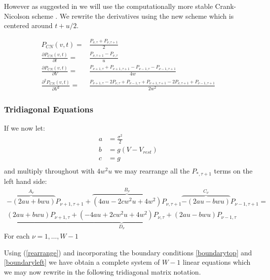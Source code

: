 \documentclass[10pt]{article}
\begin{document}
However as suggested in \cite{PaninskiHaithSzirtes} we will use the
computationally more stable Crank-Nicolson scheme \cite{press}.  
We rewrite the derivatives using the new scheme which is centered around $t +
u/2$.

\begin{eqnarray}
    P_{CN}(v,t) =& \frac{P_{\nu,\tau} + P_{\nu,\tau + 1}}{2} \\
    \frac{\partial P_{CN}(v,t)}{\partial t} =& \frac{P_{\nu,\tau +1 } -
    P_{\nu,\tau}}{u} \\
    \frac{\partial P_{CN}(v,t)}{\partial V} =&
    \frac{P_{\nu +1,\tau } + P_{\nu +1,\tau +1 } -
    P_{\nu - 1,\tau } - P_{\nu -1,\tau +1}} 
    {4w} \\
    \frac{\partial^2 P_{CN}(v,t)}{\partial V^2} =&
    \frac{P_{\nu+1,\tau} - 2 P_{\nu,\tau} + P_{\nu-1,\tau} +
    P_{\nu+1,\tau+1} - 2 P_{\nu,\tau+1} + P_{\nu-1,\tau+1}}
    {2w^2} 
\end{eqnarray}

\subsubsection{Tridiagonal Equations}

If we now let:
\begin{align*}
a &= \frac{\sigma^2}{2} \\
b &= g(V - V_{rest}) \\
c &= g \\
\end{align*}
and multiply throughout with $4w^2u$
we may rearrange all the $P_{*,\tau+1} $ terms on the left hand side:
\begin{multline}
    \overbrace{-(2au+bwu)}^{A_\nu} P_{\nu+1,\tau+1} + 
    \overbrace{(4au - 2cw^2u + 4w^2)}^{B_\nu} P_{\nu,\tau+1}
    \overbrace{-(2au-bwu)}^{C_\nu} P_{\nu-1,\tau+1}
    =  \\
    \underbrace{(2au+bwu) P_{\nu+1,\tau} +  
    (-4au +2cw^2u + 4w^2) P_{\nu,\tau} + 
    (2au-bwu) P_{\nu-1,\tau}}_{D_{\nu}}
    \label{rearrange}
\end{multline}
For each $ \nu = 1 , \dots , W-1 $

Using (\ref{rearrange}) and incorporating the boundary conditions
\ref{boundarytop} and \ref{boundaryleft} we have obtain a complete system 
of $W-1$ linear equations which we may now rewrite in the following
tridiagonal matrix notation.
\end{document}
